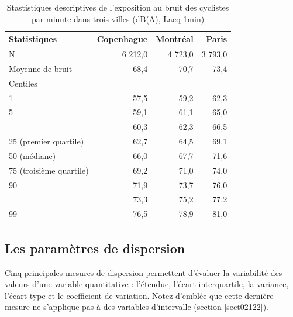 \documentclass[
  11pt,
  french,
]{book}
\begin{document}
\begin{table}

\caption{\label{tab:tableCentiles}Stastistiques descriptives de l'exposition au bruit des cyclistes par minute dans trois villes (dB(A), Laeq 1min)}
\centering
\fontsize{8}{10}\selectfont
\begin{tabular}[t]{lrrr}
\toprule
Statistiques & Copenhague & Montréal & Paris\\
\midrule
N & 6 212,0 & 4 723,0 & 3 793,0\\
Moyenne de bruit & 68,4 & 70,7 & 73,4\\
Centiles &  &  & \\
1 & 57,5 & 59,2 & 62,3\\
5 & 59,1 & 61,1 & 65,0\\
\addlinespace
10 & 60,3 & 62,3 & 66,5\\
25 (premier quartile) & 62,7 & 64,5 & 69,1\\
50 (médiane) & 66,0 & 67,7 & 71,6\\
75 (troisième quartile) & 69,2 & 71,0 & 74,0\\
90 & 71,9 & 73,7 & 76,0\\
\addlinespace
95 & 73,3 & 75,2 & 77,2\\
99 & 76,5 & 78,9 & 81,0\\
\bottomrule
\end{tabular}
\end{table}

\hypertarget{sect0253}{%
\subsection{Les paramètres de dispersion}\label{sect0253}}

Cinq principales mesures de dispersion permettent d'évaluer la variabilité des valeurs d'une variable quantitative : l'étendue, l'écart interquartile, la variance, l'écart-type et le coefficient de variation. Notez d'emblée que cette dernière mesure ne s'applique pas à des variables d'intervalle (section \ref{sect02122}).
\end{document}
